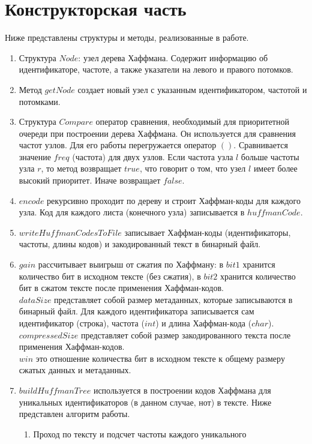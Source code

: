 \documentclass[12pt, a4paper]{article}
\begin{document}
\section{Конструкторская часть}
Ниже представлены структуры и методы, реализованные в работе.
\begin{enumerate}
	\item Структура $Node$: узел дерева Хаффмана. Содержит информацию 
	об идентификаторе, частоте, а также указатели на левого и правого 
	потомков.
	\item Метод $getNode$ создает новый узел с указанным 
	идентификатором, 
	частотой и потомками.
	\item Структура $Compare$ оператор сравнения, необходимый для 
	приоритетной очереди при построении дерева Хаффмана. Он 
	используется для сравнения частот узлов. Для его работы 
	перегружается оператор $()$. Сравнивается значение $freq$ (частота) 
	для двух узлов. Если частота узла $l$ больше частоты узла $r$, то 
	метод возвращает $true$, что говорит о том, что узел $l$ имеет 
	более высокий приоритет. Иначе возвращает $false$. 
	\item $encode$ рекурсивно проходит по дереву и строит Хаффман-коды 
	для каждого узла. Код для каждого листа (конечного узла) 
	записывается в $huffmanCode$.
	\item $writeHuffmanCodesToFile$ записывает Хаффман-коды 
	(идентификаторы, частоты, длины кодов) и закодированный текст в 
	бинарный файл.
	\item $gain$ рассчитывает выигрыш от сжатия по Хаффману: в $bit1$
	хранится количество бит в исходном тексте (без сжатия), в $bit2$
	хранится количество бит в сжатом тексте после применения 
	Хаффман-кодов.\\
	$dataSize$ представляет собой размер метаданных, 
	которые записываются в бинарный файл. Для каждого идентификатора 
	записывается сам идентификатор (строка), частота ($int$) и длина 
	Хаффман-кода ($char$).\\
	$compressedSize$ представляет собой размер закодированного 
	текста после применения Хаффман-кодов.\\
	$win$ это отношение количества бит в исходном тексте 
	к общему размеру сжатых данных и метаданных.
	\item $buildHuffmanTree$ используется в построении кодов Хаффмана для
	уникальных идентификаторов (в данном случае, нот) в тексте. Ниже представлен
	алгоритм работы.
		\begin{enumerate}
			\item Проход по тексту и подсчет частоты каждого уникального 

\end{enumerate}
\end{enumerate}
\end{document}
